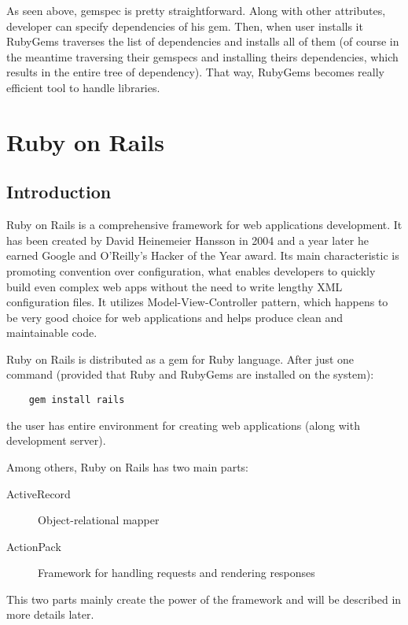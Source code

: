   
  
  As seen above, gemspec is pretty straightforward. Along with other attributes, developer can specify dependencies of his gem. Then, when user installs it RubyGems traverses the list of dependencies and installs all of them (of course in the meantime traversing their gemspecs and installing theirs dependencies, which results in the entire tree of dependency). That way, RubyGems becomes really efficient tool to handle libraries. 
  
  \section{Ruby on Rails}
    \subsection{Introduction}
  Ruby on Rails is a comprehensive framework for web applications development. It has been created by David Heinemeier Hansson in 2004 and a year later he earned Google and O'Reilly's Hacker of the Year award. Its main characteristic is promoting convention over configuration, what enables developers to quickly build even complex web apps without the need to write lengthy XML configuration files. It utilizes Model-View-Controller pattern, which happens to be very good choice for web applications and helps produce clean and maintainable code.
  
  Ruby on Rails is distributed as a gem for Ruby language. After just one command (provided that Ruby and RubyGems are installed on the system):
  
  \begin{lstlisting}
    gem install rails
  \end{lstlisting}
  
  the user has entire environment for creating web applications (along with development server).
  
  Among others, Ruby on Rails has two main parts:
  \begin{description}
    \item[ActiveRecord] Object-relational mapper
    \item[ActionPack] Framework for handling requests and rendering responses
  \end{description}
  
  This two parts mainly create the power of the framework and will be described in more details later.
  
